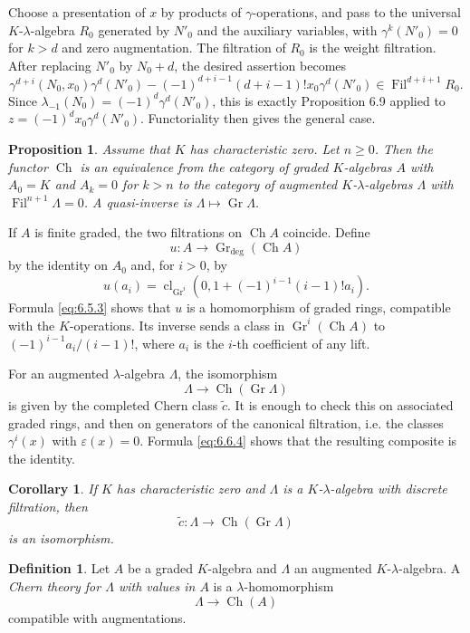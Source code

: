 \documentclass[11pt]{article}
\theoremstyle{plain}
\newtheorem{proposition}[theorem]{Proposition}
\newtheorem{corollary}[theorem]{Corollary}
\theoremstyle{definition}
\newtheorem{definition}[theorem]{Definition}
\theoremstyle{remark}
\DeclareMathOperator{\Gr}{Gr}
\DeclareMathOperator{\cl}{cl}
\providecommand{\Fil}{\operatorname{Fil}}
\providecommand{\Ch}{\operatorname{Ch}}
\begin{document}
Choose a presentation of $x$ by products of $\gamma$-operations, and pass to the universal $K$-$\lambda$-algebra $R_0$ generated by $N'_0$ and the auxiliary variables, with $\gamma^k(N'_0)=0$ for $k>d$ and zero augmentation. The filtration of $R_0$ is the weight filtration. After replacing $N'_0$ by $N_0+d$, the desired assertion becomes
\[
\gamma^{d+i}(N_0,x_0)\gamma^d(N'_0)-(-1)^{d+i-1}(d+i-1)!x_0\gamma^d(N'_0)\in\Fil^{d+i+1}R_0.
\]
Since $\lambda_{-1}(N_0)=(-1)^d\gamma^d(N'_0)$, this is exactly Proposition 6.9 applied to $z=(-1)^dx_0\gamma^d(N'_0)$. Functoriality then gives the general case.

\begin{proposition}\label{prop:6.11}
Assume that $K$ has characteristic zero. Let $n\geq 0$. Then the functor $\Ch$ is an equivalence from the category of graded $K$-algebras $A$ with $A_0=K$ and $A_k=0$ for $k>n$ to the category of augmented $K$-$\lambda$-algebras $\Lambda$ with $\Fil^{n+1}\Lambda=0$. A quasi-inverse is $\Lambda\mapsto\Gr\Lambda$.
\end{proposition}

If $A$ is finite graded, the two filtrations on $\Ch A$ coincide. Define
\[
u:A\longrightarrow\Gr_{\deg}(\Ch A)
\]
by the identity on $A_0$ and, for $i>0$, by
\[
u(a_i)=\cl_{\Gr^i}(0,1+(-1)^{i-1}(i-1)!a_i).
\]
Formula \eqref{eq:6.5.3} shows that $u$ is a homomorphism of graded rings, compatible with the $K$-operations. Its inverse sends a class in $\Gr^i(\Ch A)$ to $(-1)^{i-1}a_i/(i-1)!$, where $a_i$ is the $i$-th coefficient of any lift.

For an augmented $\lambda$-algebra $\Lambda$, the isomorphism
\[
\Lambda\longrightarrow\Ch(\Gr\Lambda)
\]
is given by the completed Chern class $\widetilde c$. It is enough to check this on associated graded rings, and then on generators of the canonical filtration, i.e. the classes $\gamma^i(x)$ with $\varepsilon(x)=0$. Formula \eqref{eq:6.6.4} shows that the resulting composite is the identity.

\begin{corollary}\label{cor:6.12}
If $K$ has characteristic zero and $\Lambda$ is a $K$-$\lambda$-algebra with discrete filtration, then
\[
\widetilde c:\Lambda\longrightarrow\Ch(\Gr\Lambda)
\]
is an isomorphism.
\end{corollary}

\begin{definition}\label{def:6.13}
Let $A$ be a graded $K$-algebra and $\Lambda$ an augmented $K$-$\lambda$-algebra. A \emph{Chern theory for $\Lambda$ with values in $A$} is a $\lambda$-homomorphism
\[
\Lambda\longrightarrow\Ch(A)
\]
compatible with augmentations.
\end{definition}
\end{document}
